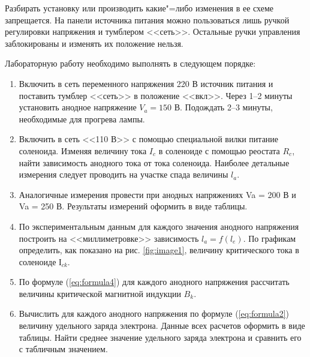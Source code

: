 Разбирать установку или производить какие"=либо изменения в ее схеме запрещается. На панели источника питания можно пользоваться лишь ручкой регулировки напряжения и тумблером <<сеть>>. Остальные ручки управления заблокированы и изменять их положение нельзя.

Лабораторную работу необходимо выполнять в следующем порядке:
\begin{enumerate}
    \item{ Включить в сеть переменного напряжения 220 В источник питания и поставить тумблер <<сеть>> в положение <<вкл>>. Через 1--2 минуты установить анодное напряжение $V_a = 150$ В. Подождать 2--3 минуты, необходимые для прогрева лампы. }
    \item{ Включить в сеть <<110 В>> с помощью специальной вилки питание соленоида. Изменяя величину тока $I_c$ в соленоиде с помощью реостата $R_c$, найти зависимость анодного тока от тока соленоида. Наиболее детальные измерения следует проводить на участке спада величины $l_a$. }
    \item{ Аналогичные измерения провести при анодных напряжениях Va = 200 В и Va = 250 В. Результаты измерений оформить в виде таблицы. }
    \item{ По экспериментальным данным для каждого значения анодного напряжения построить на <<миллиметровке>> зависимость $l_a = f(l_e)$. По графикам определить, как показано на рис. \ref{fig:image1}, величину критического тока в соленоиде $І_{ck}$. }
    \item{ По формуле (\ref{eq:formula4}) для каждого анодного напряжения рассчитать величины критической магнитной индукции $B_k$. }
    \item{ Вычислить для каждого анодного напряжения по формуле (\ref{eq:formula2}) величину удельного заряда электрона. Данные всех расчетов оформить в виде таблицы. Найти среднее значение удельного заряда электрона и сравнить его с табличным значением. }
\end{enumerate}



















